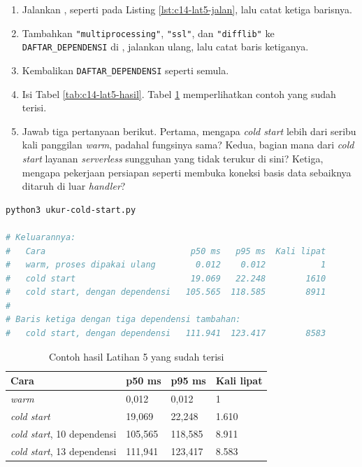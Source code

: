 \begin{enumerate}
  \item Jalankan , seperti pada Listing
        \ref{lst:c14-lat5-jalan}, lalu catat ketiga barisnya.
  \item Tambahkan \texttt{"multiprocessing"}, \texttt{"ssl"}, dan
        \texttt{"difflib"} ke \texttt{DAFTAR\_DEPENDENSI} di
        , jalankan ulang, lalu catat baris ketiganya.
  \item Kembalikan \texttt{DAFTAR\_DEPENDENSI} seperti semula.
  \item Isi Tabel \ref{tab:c14-lat5-hasil}. Tabel \ref{tab:c14-lat5-contoh}
        memperlihatkan contoh yang sudah terisi.
  \item Jawab tiga pertanyaan berikut. Pertama, mengapa \textit{cold start}
        lebih dari seribu kali panggilan \textit{warm}, padahal fungsinya
        sama? Kedua, bagian mana dari \textit{cold start} layanan
        \textit{serverless} sungguhan yang tidak terukur di sini? Ketiga,
        mengapa pekerjaan persiapan seperti membuka koneksi basis data
        sebaiknya ditaruh di luar \textit{handler}?
\end{enumerate}

\begin{lstlisting}[language=bash, caption={Membandingkan \textit{warm} dan \textit{cold start}, tersedia di \berkas{sources/chapter14/ukur-cold-start.py}}, label={lst:c14-lat5-jalan}]
python3 ukur-cold-start.py

# Keluarannya:
#   Cara                             p50 ms   p95 ms  Kali lipat
#   warm, proses dipakai ulang        0.012    0.012           1
#   cold start                       19.069   22.248        1610
#   cold start, dengan dependensi   105.565  118.585        8911
#
# Baris ketiga dengan tiga dependensi tambahan:
#   cold start, dengan dependensi   111.941  123.417        8583
\end{lstlisting}

\begin{table}[!htb]
  \centering
  \caption{Contoh hasil Latihan 5 yang sudah terisi}
  \label{tab:c14-lat5-contoh}
  \begin{tabularx}{\textwidth}{Xlll}
    \hline
    \textbf{Cara} & \textbf{p50 ms} & \textbf{p95 ms} & \textbf{Kali lipat} \\
    \hline
    \textit{warm} & 0,012 & 0,012 & 1 \\
    \hline
    \textit{cold start} & 19,069 & 22,248 & 1.610 \\
    \hline
    \textit{cold start}, 10 dependensi & 105,565 & 118,585 & 8.911 \\
    \hline
    \textit{cold start}, 13 dependensi & 111,941 & 123,417 & 8.583 \\
    \hline
  \end{tabularx}
\end{table}


